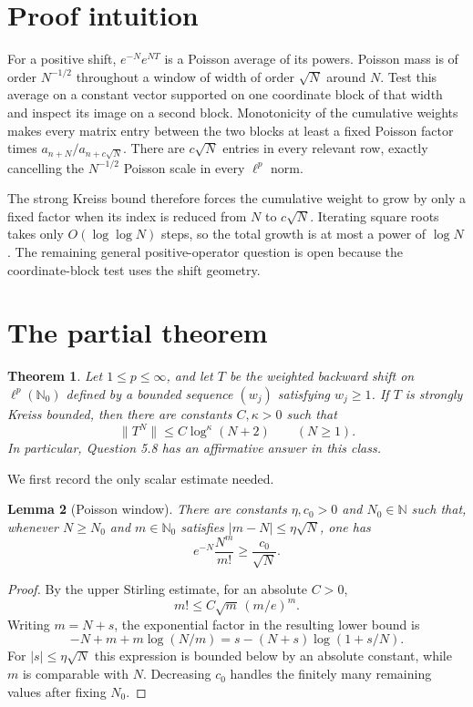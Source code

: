 \documentclass[11pt]{article}
\newtheorem{theorem}{Theorem}
\newtheorem{lemma}[theorem]{Lemma}
\newcommand{\N}{\mathbb N}
\begin{document}
\section{Proof intuition}

For a positive shift, $e^{-N}e^{NT}$ is a Poisson average of its powers.
Poisson mass is of order $N^{-1/2}$ throughout a window of width of order
$\sqrt N$ around $N$.  Test this average on a constant vector supported on
one coordinate block of that width and inspect its image on a second block.
Monotonicity of the cumulative weights makes every matrix entry between the
two blocks at least a fixed Poisson factor times
$a_{n+N}/a_{n+c\sqrt N}$.  There are $c\sqrt N$ entries in every relevant
row, exactly cancelling the $N^{-1/2}$ Poisson scale in every $\ell^p$ norm.

The strong Kreiss bound therefore forces the cumulative weight to grow by
only a fixed factor when its index is reduced from $N$ to $c\sqrt N$.
Iterating square roots takes only $O(\log\log N)$ steps, so the total growth is
at most a power of $\log N$.  The remaining general positive-operator
question is open because the coordinate-block test uses the shift geometry.

\section{The partial theorem}

\begin{theorem}\label{thm:main}
Let $1\le p\le\infty$, and let $T$ be the weighted backward shift on
$\ell^p(\N_0)$ defined by a bounded sequence $(w_j)$ satisfying $w_j\ge1$.
If $T$ is strongly Kreiss bounded, then there are constants $C,\kappa>0$
such that
\[
  \|T^N\|\le C\log^\kappa(N+2)\qquad(N\ge1).
\]
In particular, Question 5.8 has an affirmative answer in this class.
\end{theorem}

We first record the only scalar estimate needed.

\begin{lemma}[Poisson window]\label{lem:poisson}
There are constants $\eta,c_0>0$ and $N_0\in\N$ such that, whenever
$N\ge N_0$ and $m\in\N_0$ satisfies $|m-N|\le\eta\sqrt N$, one has
\[
  e^{-N}\frac{N^m}{m!}\ge \frac{c_0}{\sqrt N}.
\]
\end{lemma}

\begin{proof}
By the upper Stirling estimate, for an absolute $C>0$,
\[
 m!\le C\sqrt m\,(m/e)^m.
\]
Writing $m=N+s$, the exponential factor in the resulting lower bound is
\[
 -N+m+m\log(N/m)
 =s-(N+s)\log(1+s/N).
\]
For $|s|\le\eta\sqrt N$ this expression is bounded below by an absolute
constant, while $m$ is comparable with $N$.  Decreasing $c_0$ handles the
finitely many remaining values after fixing $N_0$.
\end{proof}
\end{document}

